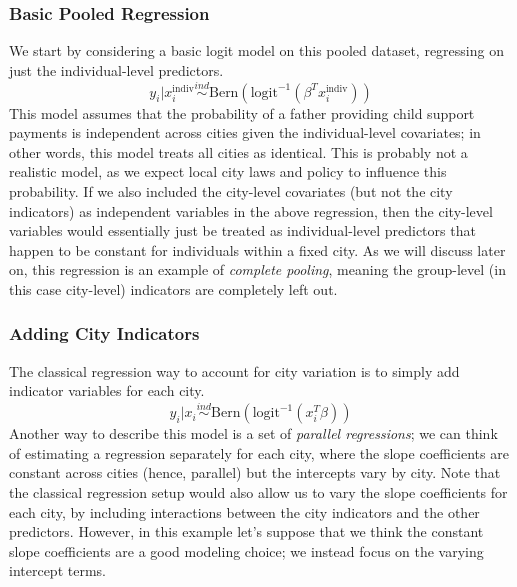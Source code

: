 \documentclass[12pt]{article}
\begin{document}
\subsubsection{Basic Pooled Regression}
We start by considering a basic logit model on this pooled dataset, regressing on just the individual-level predictors. 
\[y_i|x_i^{\text{indiv}} \overset{ind}{\sim} \text{Bern}(\text{logit}^{-1}(\beta^T x_i^{\text{indiv}})) \]
This model assumes that the probability of a father providing child support payments is independent across cities given the individual-level covariates; in other words, this model treats all cities as identical. 
This is probably not a realistic model, as we expect local city laws and policy to influence this probability. If we also included the city-level covariates (but not the city indicators) as independent variables in the above regression, then the city-level variables would essentially just be treated as individual-level predictors that happen to be constant for individuals within a fixed city. As we will discuss later on, this regression is an 
example of \textit{complete pooling}, meaning the group-level (in this case city-level) indicators are completely left out. 

\subsubsection{Adding City Indicators}
The classical regression way to account for city variation is to simply add indicator variables for each city. 
\[y_i|x_i \overset{ind}{\sim} \text{Bern}(\text{logit}^{-1}(x_i^T \beta)) \]
Another way to describe this model is a set of \textit{parallel regressions}; we can think of estimating a regression 
separately for each city, where the slope coefficients are constant across cities (hence, parallel) but the intercepts vary by city. Note that the classical regression setup would also allow us to vary the 
slope coefficients for each city, by including interactions between the city indicators and the other predictors. However, in this example let's suppose that we think the constant slope coefficients are a good 
modeling choice; we instead focus on the varying intercept terms.
\end{document}
